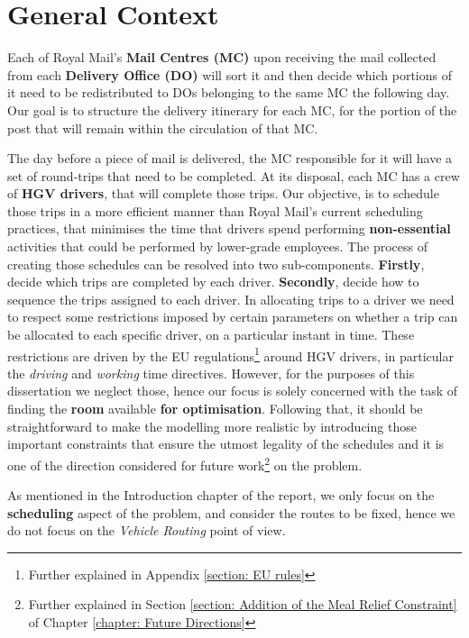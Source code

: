 \section{General Context}
\label{section: problem outline}
Each of Royal Mail's \textbf{Mail Centres (MC)} upon receiving the mail collected from each \textbf{Delivery Office (DO)} will sort it and then decide which portions of it need to be redistributed to DOs belonging to the same MC the following day. Our goal is to structure the delivery itinerary for each MC, for the portion of the post that will remain within the circulation of that MC. 


\vspace{\baselineskip}
\noindent
The day before a piece of mail is delivered, the MC responsible for it will have a set of round-trips that need to be completed. At its disposal, each MC has a crew of \textbf{HGV drivers}, that will complete those trips. Our objective, is to schedule those trips in a more efficient manner than Royal Mail's current scheduling practices, that minimises the time that drivers spend performing \textbf{non-essential} activities that could be performed by lower-grade employees. The process of creating those schedules can be resolved into two sub-components. \textbf{Firstly}, decide which trips are completed by each driver. \textbf{Secondly}, decide how to sequence the trips assigned to each driver. In allocating trips to a driver we need to respect some restrictions imposed by certain parameters on whether a trip can be allocated to each specific driver, on a particular instant in time. These restrictions are driven by the EU regulations\footnote{Further explained in Appendix \ref{section: EU rules}} around HGV drivers, in particular the \textit{driving} and \textit{working} time directives. However, for the purposes of this dissertation we neglect those, hence our focus is solely concerned with the task of finding the \textbf{room} available \textbf{for optimisation}. Following that, it should be straightforward to make the modelling more realistic by introducing those important constraints that ensure the utmost legality of the schedules and it is one of the direction considered for future work\footnote{Further explained in Section \ref{section: Addition of the Meal Relief Constraint} of Chapter \ref{chapter: Future Directions}} on the problem. 

\vspace{\baselineskip}
\noindent
As mentioned in the Introduction chapter of the report, we only focus on the \textbf{scheduling} aspect of the problem, and consider the routes to be fixed, hence we do not focus on the \textit{Vehicle Routing} point of view.


